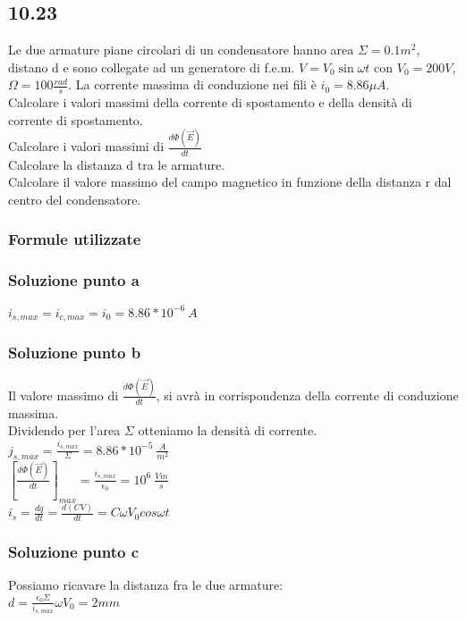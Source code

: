 \documentclass[../../main.tex]{subfiles}
\begin{document}
\subsection*{10.23}
Le due armature piane circolari di un condensatore hanno area $\Sigma = 0.1m^2$, distano d e sono collegate ad un generatore di f.e.m. $V=V_0\sin\omega t$ con $V_0 = 200V$, $\Omega = 100\frac{rad}{s}$. La corrente massima di conduzione nei fili è $i_0 = 8.86\mu A$.\\
Calcolare i valori massimi della corrente di spostamento e della densità di corrente di spostamento.\\
Calcolare i valori massimi di $\frac{d\Phi(\vec{E})}{dt}$\\
Calcolare la distanza d tra le armature.\\
Calcolare il valore massimo del campo magnetico in funzione della distanza r dal centro del condensatore.
\subsubsection*{Formule utilizzate}
\subsubsection*{Soluzione punto a}
$i_{s, max} = i_{c, max}=i_0 = 8.86 * 10^{-6}\ A$\\
\subsubsection*{Soluzione punto b}
Il valore massimo di $\frac{d\Phi(\vec{E})}{dt}$, si avrà in corrispondenza della corrente di conduzione massima.\\
Dividendo per l'area $\Sigma$ otteniamo la densità di corrente.\\
$j_{s, max} = \frac{i_{s, max}}{\Sigma} = 8.86 * 10^{-5}\ \frac{A}{m^2}$\\
$\left[\frac{d\Phi(\vec{E})}{dt}\right]_{max} = \frac{i_{s, max}}{\epsilon_0} = 10^6\ \frac{Vm}{s}$\\
$i_s = \frac{dq}{dt} = \frac{d(CV)}{dt} = C\omega V_0 cos\omega t$\\
\subsubsection*{Soluzione punto c}
Possiamo ricavare la distanza fra le due armature:\\
$d = \frac{\epsilon_0 \Sigma}{i_{s ,max}}\omega V_0 = 2 mm$\\
\end{document}
